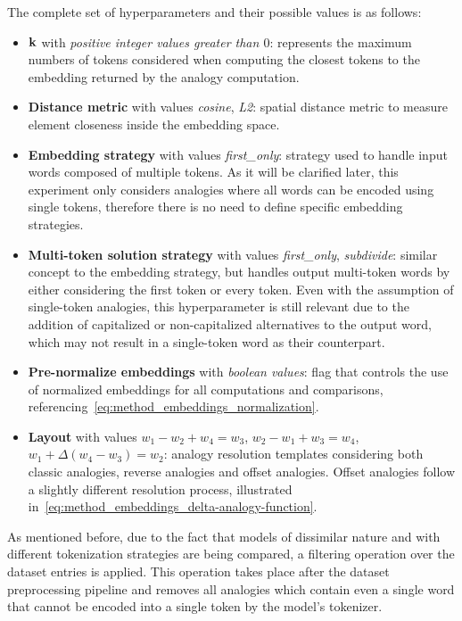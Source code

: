 The complete set of hyperparameters and their possible values is as follows:
\begin{itemize}
    \item $\bm{\mathbf{k}}$ with \emph{positive integer values greater than $0$}: represents the maximum numbers of tokens considered when computing the closest tokens to the embedding returned by the analogy computation.
    \item \textbf{Distance metric} with values \emph{cosine}, \emph{L2}: spatial distance metric to measure element closeness inside the embedding space.
    \item \textbf{Embedding strategy} with values \emph{first\_only}: strategy used to handle input words composed of multiple tokens.
As it will be clarified later, this experiment only considers analogies where all words can be encoded using single tokens, therefore there is no need to define specific embedding strategies.
    \item \textbf{Multi-token solution strategy} with values \emph{first\_only}, \emph{subdivide}: similar concept to the embedding strategy, but handles output multi-token words by either considering the first token or every token.
Even with the assumption of single-token analogies, this hyperparameter is still relevant due to the addition of capitalized or non-capitalized alternatives to the output word, which may not result in a single-token word as their counterpart.
    \item \textbf{Pre-normalize embeddings} with \emph{boolean values}: flag that controls the use of normalized embeddings for all computations and comparisons, referencing~\cref{eq:method_embeddings_normalization}.
    \item \textbf{Layout} with values $w_1 - w_2 + w_4 = w_3$, $w_2 - w_1 + w_3 = w_4$, $w_1 + \Delta(w_4 - w_3) = w_2$: analogy resolution templates considering both classic analogies, reverse analogies and offset analogies.
Offset analogies follow a slightly different resolution process, illustrated in~\cref{eq:method_embeddings_delta-analogy-function}.
\end{itemize}

As mentioned before, due to the fact that models of dissimilar nature and with different tokenization strategies are being compared, a filtering operation over the dataset entries is applied.
This operation takes place after the dataset preprocessing pipeline and removes all analogies which contain even a single word that cannot be encoded into a single token by the model's tokenizer.

